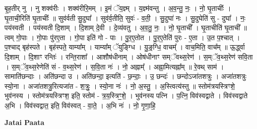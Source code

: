 \documentclass[17pt]{extarticle}
\begin{document}
बृ॒ह॒तीर् नु । नु शक्व॑रीः । शक्व॑रीरि॒मम् । इ॒मं ॅय॒ज्ञ्म् । य॒ज्ञ्म॑वन्तु । अ॒व॒न्तु॒ नः॒ । नो॒ घृ॒ताचीः᳚ । घृ॒ताची॒रिति॑ घृ॒ताचीः᳚ ॥ सुव॑र्वती सु॒दुघा᳚ । सुव॑र्व॒तीति॒ सुवः॑ - व॒ती॒ । सु॒दुघा॑ नः । सु॒दुघेति॑ सु - दुघा᳚ । नः॒ पय॑स्वती । पय॑स्वती दि॒शाम् । दि॒शाम् दे॒वी । दे॒व्य॑वतु । अ॒व॒तु॒ नः॒ । नो॒ घृ॒ताची᳚ । घृ॒ताचीति॑ घृ॒ताची᳚ ॥ त्वम् गो॒पाः । गो॒पाः पु॑रए॒ता । गो॒पा इति॑ गो - पाः । पु॒र॒ए॒तोत । पु॒र॒ए॒तेति॑ पुरः - ए॒ता । उ॒त प॒श्चात् । प॒श्चाद् बृह॑स्पते । बृह॑स्पते॒ याम्या᳚म् । याम्या᳚म् ॅयुङ्ग्धि । यु॒ङ्॒ग्धि॒ वाचम्᳚ । वाच॒मिति॒ वाच᳚म् ॥ ऊ॒र्द्ध्वा दि॒शाम् । दि॒शाꣳ रन्तिः॑ । रन्ति॒राशा᳚ । आशौष॑धीनाम् । ओष॑धीनाꣳ सम्ॅवथ्स॒रेण॑ । स॒म्ॅव॒थ्स॒रेण॑ सवि॒ता । स॒म्ॅव॒थ्स॒रेणेति॑ सं - व॒थ्स॒रेण॑ । स॒वि॒ता नः॑ । नो॒ अह्नाम्᳚ । अह्ना॒मित्यह्ना᳚म् ॥ रे॒वथ् साम॑ । सामाति॑छन्दाः । अति॑छन्दा उ । 
अति॑छन्दा॒ इत्यति॑ - छ॒न्दाः॒ । उ॒ छन्दः॑ । छन्दोऽजा॑तशत्रुः । अजा॑तशत्रुः स्यो॒ना । अजा॑तशत्रु॒रित्यजा॑त - श॒त्रुः॒ । स्यो॒ना नः॑ । नो॒ अ॒स्तु॒ । अ॒स्त्वित्य॑स्तु ॥ स्तोम॑त्रयस्त्रिꣳशे॒ भुव॑नस्य । स्तोम॑त्रयस्त्रिꣳश॒ इति॒ स्तोम॑ - त्र॒य॒स्त्रिꣳ॒॒शे॒ । भुव॑नस्य पत्नि । प॒त्नि॒ विव॑स्वद्वाते । विव॑स्वद्वाते अ॒भि । विव॑स्वद्वात॒ इति॒ विव॑स्वत् - वा॒ते॒ । अ॒भि नः॑ । नो॒ गृ॒णा॒हि॒ \newline

\textbf{Jatai Paata} \newline
\end{document}
